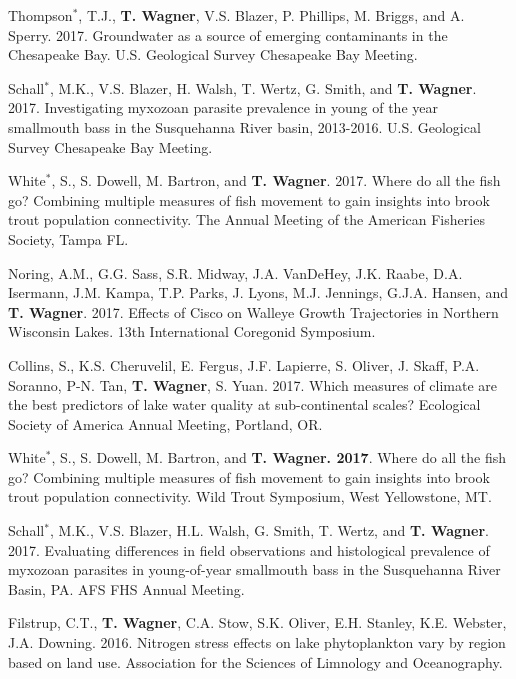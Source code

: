 \documentclass[10pt]{article}
\begin{document}
\begin{flushleft}
\begin{etaremune}
\item Thompson$^*$, T.J., {\bf T. Wagner}, V.S. Blazer, P. Phillips, M. Briggs, and A. Sperry. 2017. Groundwater as a source of emerging contaminants in the Chesapeake Bay. U.S. Geological Survey Chesapeake Bay Meeting.

\item Schall$^*$, M.K., V.S. Blazer, H. Walsh, T. Wertz, G. Smith, and {\bf T. Wagner}. 2017. Investigating myxozoan parasite prevalence in young of the year smallmouth bass in the Susquehanna River basin, 2013-2016. U.S. Geological Survey Chesapeake Bay Meeting.

\item White$^*$, S., S. Dowell, M. Bartron, and {\bf T. Wagner}. 2017. Where do all the fish go? Combining multiple measures of fish movement to gain insights into brook trout population connectivity. The Annual Meeting of the American Fisheries Society, Tampa FL.

\item Noring, A.M., G.G. Sass, S.R. Midway, J.A. VanDeHey, J.K. Raabe, D.A. Isermann, J.M. Kampa, T.P. Parks, J. Lyons, M.J. Jennings, G.J.A. Hansen, and {\bf T. Wagner}. 2017. Effects of Cisco on Walleye Growth Trajectories in Northern Wisconsin Lakes. 13th International Coregonid Symposium.

\item Collins, S., K.S. Cheruvelil, E. Fergus, J.F. Lapierre, S. Oliver, J. Skaff, P.A. Soranno, P-N. Tan, {\bf T. Wagner}, S. Yuan. 2017. Which measures of climate are the best predictors of lake water quality at sub-continental scales? Ecological Society of America Annual Meeting, Portland, OR. 

\item White$^*$, S., S. Dowell, M. Bartron, and {\bf T. Wagner. 2017}. Where do all the fish go? Combining multiple measures of fish movement to gain insights into brook trout population connectivity. Wild Trout Symposium, West Yellowstone, MT.

\item Schall$^*$, M.K., V.S. Blazer, H.L. Walsh, G. Smith, T. Wertz, and {\bf T. Wagner}. 2017. Evaluating differences in field observations and histological prevalence of myxozoan parasites in young-of-year smallmouth bass in the Susquehanna River Basin, PA. AFS FHS Annual Meeting.

\item Filstrup, C.T.,  {\bf T. Wagner}, C.A. Stow, S.K. Oliver, E.H. Stanley, K.E. Webster, J.A. Downing. 2016. Nitrogen stress effects on lake phytoplankton vary by region based on land use. Association for the Sciences of Limnology and Oceanography. 


\end{etaremune}
\end{flushleft}
\end{document}
